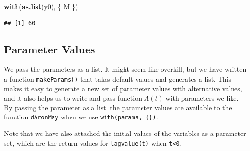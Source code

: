 \documentclass[
]{book}
\newenvironment{Shaded}{\begin{snugshade}}{\end{snugshade}}
\newcommand{\FunctionTok}[1]{\textcolor[rgb]{0.13,0.29,0.53}{\textbf{#1}}}
\newcommand{\NormalTok}[1]{#1}
\begin{document}
\begin{Shaded}
\begin{Highlighting}[]
\FunctionTok{with}\NormalTok{(}\FunctionTok{as.list}\NormalTok{(y0), \{}
\NormalTok{  M}
\NormalTok{\})}
\end{Highlighting}
\end{Shaded}

\begin{verbatim}
## [1] 60
\end{verbatim}

\hypertarget{parameter-values}{%
\subsection{Parameter Values}\label{parameter-values}}

We pass the parameters as a list. It might seem like overkill, but we have written a function \texttt{makeParams()} that takes default values and generates a list. This makes it easy to generate a new set of parameter values with alternative values, and it also helps us to write and pass function \(\Lambda(t)\) with parameters we like. By passing the parameter as a list, the parameter values are available to the function \texttt{dAronMay} when we use \texttt{with(params,\ \{\})}.

Note that we have also attached the initial values of the variables as a parameter set, which are the return values for \texttt{lagvalue(t)} when \texttt{t\textless{}0}.
\end{document}
